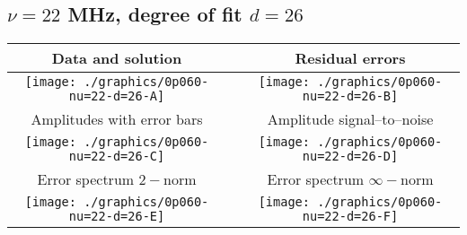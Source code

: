 

% 

\clearpage{}
\break{}

\subsection{$\nu = 22$ MHz, degree of fit $d = 26$}

\begin{table}[h]
    \begin{center}
        \begin{tabular}{ccc}
            Data and solution & \quad & Residual errors \\\hline
            \texttt{[image: ./graphics/0p060-nu=22-d=26-A]} &&
            \texttt{[image: ./graphics/0p060-nu=22-d=26-B]} \\[15pt]
            Amplitudes with error bars && Amplitude signal--to--noise \\\hline
            \texttt{[image: ./graphics/0p060-nu=22-d=26-C]} &&
            \texttt{[image: ./graphics/0p060-nu=22-d=26-D]} \\[15pt]
            Error spectrum $2-$norm && Error spectrum $\infty-$norm \\\hline
            \texttt{[image: ./graphics/0p060-nu=22-d=26-E]} &&
            \texttt{[image: ./graphics/0p060-nu=22-d=26-F]} \\[15pt]
        \end{tabular}
    \end{center}
\label{fig:elev=60, nu=22}
\end{table}



\endinput
